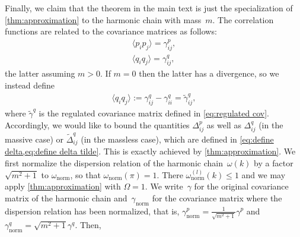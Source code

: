 \documentclass[submission, Phys]{SciPost}
\theoremstyle{definition}
\theoremstyle{remark}
\DeclareMathOperator{\mera}{MERA}
\DeclareMathOperator{\exact}{exact}
\DeclareMathOperator{\normalized}{norm}
\DeclarePairedDelimiter{\abs}{\lvert}{\rvert}
\begin{document}
\begin{appendix}
Finally, we claim that the theorem in the main text is just the specialization of \cref{thm:approximation} to the harmonic chain with mass~$m$.
The correlation functions are related to the covariance matrices as follows:
\begin{align*}
  \langle p_i p_j \rangle = \gamma^p_{ij}, \\
  \langle q_i q_j \rangle = \gamma^q_{ij},
\end{align*}
the latter assuming $m>0$.
If $m = 0$ then the latter has a divergence, so we instead define
\begin{align}\label{eq:subtract divergence}
  \langle q_i q_j \rangle := \gamma^q_{ij} - \gamma^q_{ii} = \tilde\gamma^q_{ij},
\end{align}
where $\tilde\gamma^q$ is the regulated covariance matrix defined in \cref{eq:regulated cov}.
Accordingly, we would like to bound the quantities $\Delta^p_{ij}$ as well as $\Delta^q_{ij}$ (in the massive case) or $\tilde\Delta^q_{ij}$ (in the massless case), which are defined in \cref{eq:define delta,eq:define delta tilde}.
This is exactly achieved by \cref{thm:approximation}.
We first normalize the dispersion relation of the harmonic chain~$\omega(k)$ by a factor $\sqrt{m^2 + 1}$ to $\omega_{\normalized}$, so that $\omega_{\normalized}(\pi) = 1$.
There $\omega_{\normalized}^{(l)}(k) \leq 1$ and we may apply \cref{thm:approximation} with $\Omega = 1$.
We write~$\gamma$ for the original covariance matrix of the harmonic chain and~$\gamma_{\normalized}$ for the covariance matrix where the dispersion relation has been normalized, that is, $\gamma_{\normalized}^p = \frac{1}{\sqrt{m^2 + 1}} \gamma^p$ and $\gamma_{\normalized}^q = \sqrt{m^2 + 1} \gamma^q$.
Then,
\begin{equation*}

\end{equation*}
\end{appendix}
\end{document}
